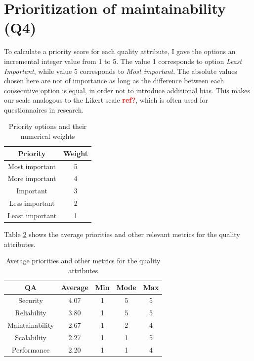 \documentclass[utf8,english]{gradu3}
\newcommand{\todo}[1]{\textbf{\textcolor{red}{#1}}}
\begin{document}
\section{Prioritization of maintainability (Q4)}

To calculate a priority score for each quality attribute, I gave the options an
incremental integer value from 1 to 5. The value 1 corresponds to option
\textit{Least Important}, while value 5 corresponds to \textit{Most important}.
The absolute values chosen here are not of importance as long as the difference
between each consecutive option is equal, in order not to introduce additional
bias. This makes our scale analogous to the Likert scale \todo{ref?}, which is
often used for questionnaires in research.


\begin{table}[!h]
  \begin{center}
    \caption{Priority options and their numerical weights}
    \label{table:priorities1}
    \begin{tabular}{|c|c|}
      \hline
      \textbf{Priority} & \textbf{Weight} \\
      \hline
      Most important    & 5               \\
      More important    & 4               \\
      Important         & 3               \\
      Less important    & 2               \\
      Least important   & 1               \\
      \hline
    \end{tabular}
  \end{center}
\end{table}

Table \ref{table:priorities2} shows the average priorities and other relevant
metrics for the quality attributes.

\begin{table}[!h]
  \begin{center}
    \caption{Average priorities and other metrics for the quality attributes}
    \label{table:priorities2}
    \begin{tabular}{|c|c|c|c|c|}
      \hline
      \textbf{QA}     & \textbf{Average} & \textbf{Min} & \textbf{Mode} & \textbf{Max} \\
      \hline
      Security        & 4.07             & 1            & 5             & 5            \\
      Reliability     & 3.80             & 1            & 5             & 5            \\
      Maintainability & 2.67             & 1            & 2             & 4            \\
      Scalability     & 2.27             & 1            & 1             & 5            \\
      Performance     & 2.20             & 1            & 1             & 4            \\
      \hline
    \end{tabular}
  \end{center}
\end{table}
\end{document}
